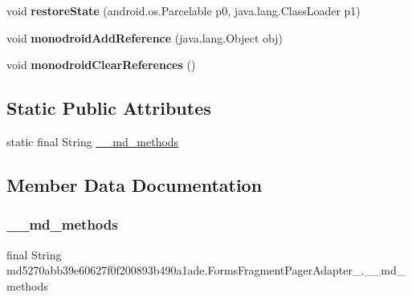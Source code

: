 \begin{DoxyCompactItemize}
void {\bfseries restore\+State} (android.\+os.\+Parcelable p0, java.\+lang.\+Class\+Loader p1)
\item 
\mbox{\label{classmd5270abb39e60627f0f200893b490a1ade_1_1_forms_fragment_pager_adapter__1_a87599b19cc33d84cefbf80e0b04fcfab}} 
void {\bfseries monodroid\+Add\+Reference} (java.\+lang.\+Object obj)
\item 
\mbox{\label{classmd5270abb39e60627f0f200893b490a1ade_1_1_forms_fragment_pager_adapter__1_a5941647e9fc5cbd3d54d30eb23d50364}} 
void {\bfseries monodroid\+Clear\+References} ()
\end{DoxyCompactItemize}
\subsection*{Static Public Attributes}
\begin{DoxyCompactItemize}
\item 
static final String \hyperlink{classmd5270abb39e60627f0f200893b490a1ade_1_1_forms_fragment_pager_adapter__1_a8ceb71ce95bf7e4591c10f858ad3dd52}{\+\_\+\+\_\+md\+\_\+methods}
\end{DoxyCompactItemize}


\subsection{Member Data Documentation}
\mbox{\label{classmd5270abb39e60627f0f200893b490a1ade_1_1_forms_fragment_pager_adapter__1_a8ceb71ce95bf7e4591c10f858ad3dd52}} 
\subsubsection{\texorpdfstring{\+\_\+\+\_\+md\+\_\+methods}{\_\_md\_methods}}
{\footnotesize\ttfamily final String md5270abb39e60627f0f200893b490a1ade.\+Forms\+Fragment\+Pager\+Adapter\+\_.\+\_\+\+\_\+md\+\_\+methods\hspace{0.3cm}{\ttfamily [static]}}



